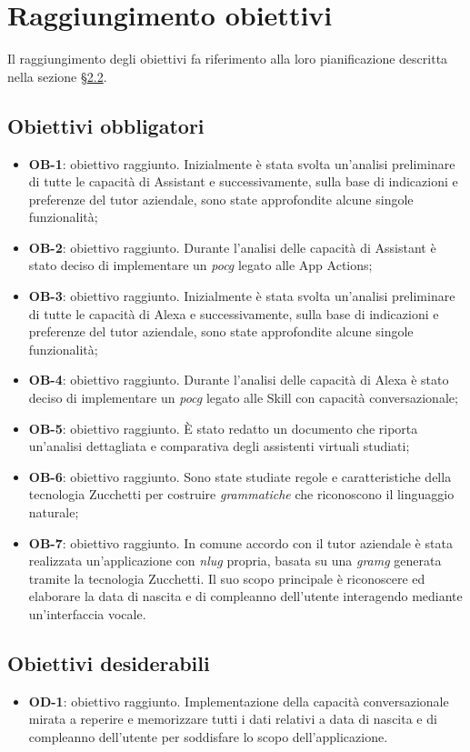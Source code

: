 \section{Raggiungimento obiettivi}
Il raggiungimento degli obiettivi fa riferimento alla loro pianificazione descritta nella sezione §\hyperref[obiettivi]{2.2}.
\subsection{Obiettivi obbligatori}
\begin{itemize}
	\item \textbf{OB-1}: obiettivo raggiunto. Inizialmente è stata svolta un'analisi preliminare di tutte le capacità di Assistant e successivamente, sulla base di indicazioni e preferenze del tutor aziendale, sono state approfondite alcune singole funzionalità;
	\item \textbf{OB-2}: obiettivo raggiunto. Durante l'analisi delle capacità di Assistant è stato deciso di implementare un \emph{\gls{pocg}} legato alle App Actions;
	\item \textbf{OB-3}: obiettivo raggiunto. Inizialmente è stata svolta un'analisi preliminare di tutte le capacità di Alexa e successivamente, sulla base di indicazioni e preferenze del tutor aziendale, sono state approfondite alcune singole funzionalità;
	\item \textbf{OB-4}: obiettivo raggiunto. Durante l'analisi delle capacità di Alexa è stato deciso di implementare un \emph{\gls{pocg}} legato alle Skill con capacità conversazionale;
	\item \textbf{OB-5}: obiettivo raggiunto. È stato redatto un documento che riporta un'analisi dettagliata e comparativa degli assistenti virtuali studiati;
	\item \textbf{OB-6}: obiettivo raggiunto. Sono state studiate regole e caratteristiche della tecnologia Zucchetti per costruire \emph{grammatiche} che riconoscono il linguaggio naturale;
	\item \textbf{OB-7}: obiettivo raggiunto. In comune accordo con il tutor aziendale è stata realizzata un'applicazione con \emph{\gls{nlug}} propria, basata su una \emph{\gls{gramg}} generata tramite la tecnologia Zucchetti. Il suo scopo principale è riconoscere ed elaborare la data di nascita e di compleanno dell'utente interagendo mediante un'interfaccia vocale.
\end{itemize}
\subsection{Obiettivi desiderabili}
\begin{itemize}
	\item \textbf{OD-1}: obiettivo raggiunto. Implementazione della capacità conversazionale mirata a reperire e memorizzare tutti i dati relativi a data di nascita e di compleanno dell'utente per soddisfare lo scopo dell'applicazione.
\end{itemize}
